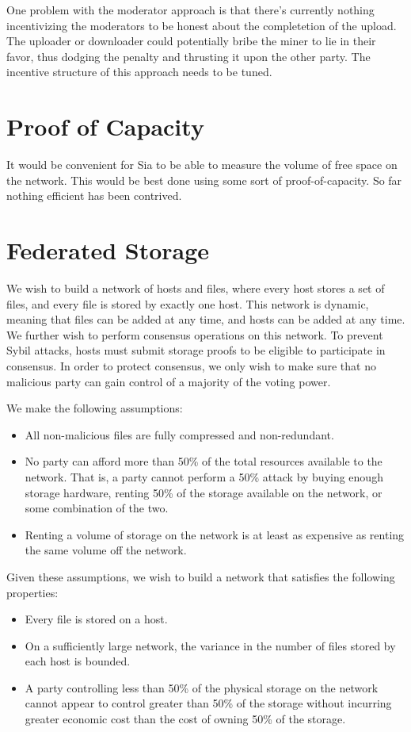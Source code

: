 \documentclass[twocolumn]{article}
\begin{document}
One problem with the moderator approach is that there's currently nothing incentivizing the moderators to be honest about the completetion of the upload.
The uploader or downloader could potentially bribe the miner to lie in their favor, thus dodging the penalty and thrusting it upon the other party.
The incentive structure of this approach needs to be tuned.

\section{Proof of Capacity}
It would be convenient for Sia to be able to measure the volume of free space on the network.
This would be best done using some sort of proof-of-capacity.
So far nothing efficient has been contrived.

\section{Federated Storage}
We wish to build a network of hosts and files, where every host stores a set of files, and every file is stored by exactly one host.
This network is dynamic, meaning that files can be added at any time, and hosts can be added at any time.
We further wish to perform consensus operations on this network.
To prevent Sybil attacks, hosts must submit storage proofs to be eligible to participate in consensus.
In order to protect consensus, we only wish to make sure that no malicious party can gain control of a majority of the voting power.

We make the following assumptions:
\begin{itemize}
	\item All non-malicious files are fully compressed and non-redundant.
	\item No party can afford more than 50\% of the total resources available to the network. That is, a party cannot perform a 50\% attack by buying enough storage hardware, renting 50\% of the storage available on the network, or some combination of the two.
	\item Renting a volume of storage on the network is at least as expensive as renting the same volume off the network.
\end{itemize}

Given these assumptions, we wish to build a network that satisfies the following properties:
\begin{itemize}
	\item Every file is stored on a host.
	\item On a sufficiently large network, the variance in the number of files stored by each host is bounded.
	\item A party controlling less than 50\% of the physical storage on the network cannot appear to control greater than 50\% of the storage without incurring greater economic cost than the cost of owning 50\% of the storage.
\end{itemize}
\end{document}

